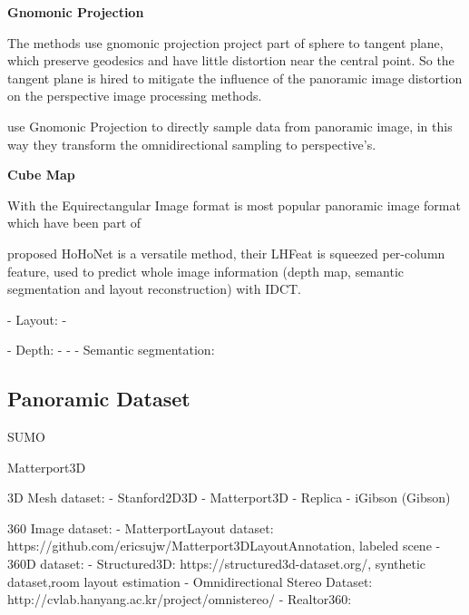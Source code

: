 \cite{eder2019mapped}



\textbf{Gnomonic Projection} ~\cite{gnomonicprojection}

The methods use gnomonic projection project part of sphere to tangent plane, which preserve geodesics and have little distortion near the central point.
So the tangent plane is hired to mitigate the influence of the panoramic image  distortion on the perspective image processing methods.

\cite{coors2018spherenet} use Gnomonic Projection to directly sample data from panoramic image, in this way they transform the omnidirectional sampling to perspective's.

\textbf{Cube Map}

With the
Equirectangular Image format is most popular panoramic image format which have been part of 


\cite{sun2020hohonet} proposed HoHoNet is a versatile method, their LHFeat is squeezed per-column feature, used to predict whole image information (depth map, semantic segmentation and layout reconstruction) with IDCT. 

- Layout:
- \cite{xxxx}

- Depth:
- \cite{wang2020bifuse} 
- 
- Semantic segmentation:


\subsection{Panoramic Dataset}


SUMO

Matterport3D

3D Mesh dataset:
- Stanford2D3D \cite{armeni2017joint}
- Matterport3D
- Replica
- iGibson (Gibson)

360 Image dataset:
- MatterportLayout dataset: https://github.com/ericsujw/Matterport3DLayoutAnnotation, labeled scene
- 360D dataset:
- Structured3D: https://structured3d-dataset.org/, synthetic dataset,room layout estimation
- Omnidirectional Stereo Dataset: http://cvlab.hanyang.ac.kr/project/omnistereo/
- Realtor360: 

